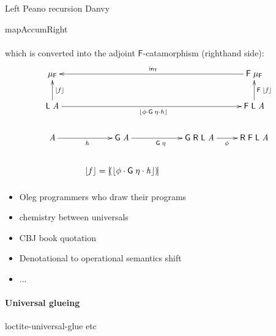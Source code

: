 \documentclass{elsarticle}
\newcommand{\Conid}[1]{\mathit{#1}}
\newcommand{\Varid}[1]{\mathit{#1}}
\def\myxym#1{\vcenter{\xymatrix{#1}}}
\def\comp{ \mathbin{\cdot} }
\def\fun#1{\mathsf{#1}}
\def\muF{\mu_{\fun F}}
\def\muF{\mu_{\fun F}}
\begin{document}
Left Peano recursion Danvy

mapAccumRight
%

\paragraph{}
%

\paragraph{}
which is converted into the adjoint \ensuremath{\fun F }-catamorphism (righthand side):
\begin{eqnarray*}
\myxym{
	\ensuremath{\muF }
&
&
&
	\ensuremath{\fun F \;\muF }
		\ar[lll]_{\ensuremath{\mathsf{in}_{\fun T}}}
\\
	\ensuremath{\fun L \;\Conid{A}}
		\ar[u]_{\ensuremath{\lfloor \Varid{f}\rfloor}}
		\ar[rrr]_{\ensuremath{\lfloor \phi  \comp \fun G \;\eta  \comp \Varid{h}\rfloor}}
&
&
&
	\ensuremath{\fun F \;\fun L \;\Conid{A}}
		\ar[u]_{\ensuremath{\fun F \;\lfloor \Varid{f}\rfloor}}
\\
	\ensuremath{\Conid{A}}
		\ar[r]_{\ensuremath{\Varid{h}}}
&
	\ensuremath{\fun G \;\Conid{A}}
		\ar[r]_{\ensuremath{\fun G \;\eta }}
&
	\ensuremath{\fun G \;\fun R \;\fun L \;\Conid{A}}
		\ar[r]_{\ensuremath{\phi }}
&
	\ensuremath{\fun R \;\fun F \;\fun L \;\Conid{A}}
\\
&
	\ensuremath{\lfloor \Varid{f}\rfloor\mathrel{=}\mathopen{[\!(}\lfloor \phi  \comp \fun G \;\eta  \comp \Varid{h}\rfloor\mathclose{)\!]}}
}
\end{eqnarray*}

%

\paragraph{}
\begin{itemize}
\item	Oleg programmers who draw their programs
\item	chemistry between universals
\item	CBJ book quotation
\item	Denotational to operational semantics shift
\item	...
\end{itemize}
%

\paragraph{Universal glueing}
loctite-universal-glue etc
%
%
\end{document}
